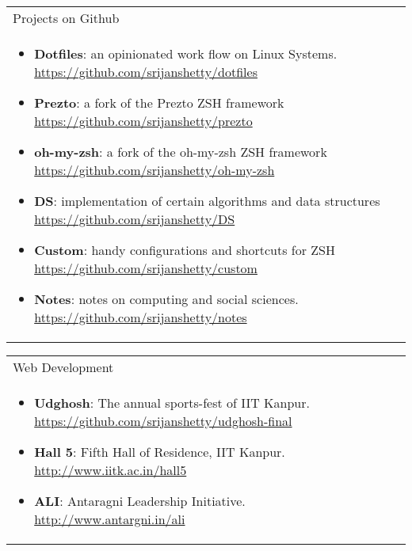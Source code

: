\documentclass[a4paper,10pt]{article} %
\newcommand{\projectlist}[2]{
    \begin{tabular}{p{\linewidth}}
        \textcolor{NavyBlue}{#1}\\
        \vspace{-0.3cm}
        \footnotesize{#2}
    \end{tabular}
    \vspace{-0.4cm}
}
\begin{document}
\projectlist {Projects on Github}
             {
                 \begin{itemize}[leftmargin=0.5cm]
                     \item \textbf{Dotfiles}: an opinionated work flow on Linux Systems.
                         \href{https://github.com/srijanshetty/dotfiles} {https://github.com/srijanshetty/dotfiles}
                     \item \textbf{Prezto}: a fork of the Prezto ZSH framework
                         \href{https://github.com/srijanshetty/prezto} {https://github.com/srijanshetty/prezto}
                     \item \textbf{oh-my-zsh}: a fork of the oh-my-zsh ZSH framework
                         \href{https://github.com/srijanshetty/oh-my-zsh} {https://github.com/srijanshetty/oh-my-zsh}
                     \item \textbf{DS}: implementation of certain algorithms and data structures
                         \href{https://github.com/srijanshetty/DS} {https://github.com/srijanshetty/DS}
                     \item \textbf{Custom}: handy configurations and shortcuts for ZSH
                         \href{https://github.com/srijanshetty/custom} {https://github.com/srijanshetty/custom}
                     \item \textbf{Notes}: notes on computing and social sciences.
                         \href{https://github.com/srijanshetty/notes} {https://github.com/srijanshetty/notes}
                 \end{itemize}
             }

\projectlist {Web Development}
             {
                 \begin{itemize}[leftmargin=0.5cm]
                     \item \textbf{Udghosh}: The annual sports-fest of IIT Kanpur.
                         \href{https://github.com/srijanshetty/udghosh-final}{https://github.com/srijanshetty/udghosh-final}
                     \item \textbf{Hall 5}: Fifth Hall of Residence, IIT Kanpur.
                         \href{http://www.iitk.ac.in/hall5} {http://www.iitk.ac.in/hall5}
                     \item \textbf{ALI}: Antaragni Leadership Initiative.
                         \href{http://www.antargni.in/ali} {http://www.antargni.in/ali}
                 \end{itemize}
             }
\end{document}
